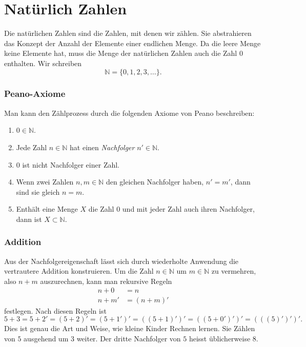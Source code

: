 %
%
%
\section{Natürlich Zahlen
\label{buch:section:natuerliche-zahlen}}
Die natürlichen Zahlen sind die Zahlen, mit denen wir zählen.
%
%
Sie abstrahieren das Konzept der Anzahl der Elemente einer endlichen
Menge.
Da die leere Menge keine Elemente hat, muss die Menge der natürlichen
Zahlen auch die Zahl $0$ enthalten.
Wir schreiben
\[
\mathbb{N}
=
\{
0,1,2,3,\dots
\}.
\]

\subsubsection{Peano-Axiome}
Man kann den Zählprozess durch die folgenden Axiome von Peano beschreiben:
%
\begin{enumerate}
\item $0\in\mathbb N$.
\item Jede Zahl $n\in \mathbb{N}$ hat einen {\em Nachfolger}
$n'\in \mathbb{N}$.
%
\item $0$ ist nicht Nachfolger einer Zahl.
\item Wenn zwei Zahlen $n,m\in\mathbb{N}$ den gleichen Nachfolger haben,
$n'=m'$, dann sind sie gleich $n=m$.
\item Enthält eine Menge $X$ die Zahl $0$ und mit jeder Zahl auch ihren
Nachfolger, dann ist $X\subset\mathbb{N}$. %
\end{enumerate}

\subsubsection{Addition}
Aus der Nachfolgereigenschaft lässt sich durch wiederholte Anwendung
die vertrautere Addition konstruieren.
%
Um die Zahl $n\in\mathbb{N}$ um $m\in\mathbb{N}$ zu vermehren, also
$n+m$ auszurechnen, kann man rekursive Regeln
\begin{align*}
n+0&=n\\
n+m'&=(n+m)'
\end{align*}
festlegen.
Nach diesen Regeln ist
\[
5+3
=
5+2'
=
(5+2)'
=
(5+1')'
=
((5+1)')'
=
((5+0')')'
=
(((5)')')'.
\]
Dies ist genau die Art und Weise, wie kleine Kinder Rechnen lernen.
Sie Zählen von $5$ ausgehend um $3$ weiter.
Der dritte Nachfolger von $5$ heisst üblicherweise $8$.

